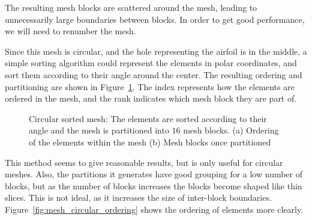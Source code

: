 The resulting mesh blocks are scattered around the mesh, leading to unnecessarily large boundaries
between blocks. In order to get good performance, we will need to renumber the mesh. 

Since this mesh is circular, and the hole representing the airfoil is in the middle, a simple
sorting algorithm could represent the elements in polar coordinates, and sort them according to
their angle around the center. The resulting ordering and partitioning are shown in
Figure~\ref{fig:mesh_circular}. The index represents how the elements are ordered in the mesh, and
the rank indicates which mesh block they are part of.

\begin{figure}[H]
    \centering
    \caption{Circular sorted mesh: The elements are sorted according to their angle and the mesh is partitioned into \(16\) mesh blocks. (a) Ordering of the elements within the mesh (b) Mesh blocks once partitioned}\label{fig:mesh_circular}
\end{figure}

This method seems to give reasonable results, but is only useful for circular meshes. Also, the
partitions it generates have good grouping for a low number of blocks, but as the number of blocks
increases the blocks become shaped like thin slices. This is not ideal, as it increases the size of
inter-block boundaries. Figure~\ref{fig:mesh_circular_ordering} shows the ordering of elements more
clearly.

